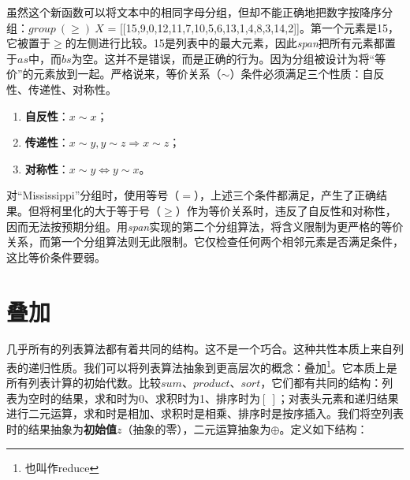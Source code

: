 \documentclass[b5paper]{ctexart}
\begin{document}
\be
{}
\ee

虽然这个新函数可以将文本中的相同字母分组，但却不能正确地把数字按降序分组：$\textit{group}\ (\geq)\ X$ = [[15,9,0,12,11,7,10,5,6,13,1,4,8,3,14,2]]。第一个元素是15，它被置于$\geq$的左侧进行比较。15是列表中的最大元素，因此\textit{span}把所有元素都置于$as$中，而$bs$为空。这并不是错误，而是正确的行为。因为分组被设计为将“等价”的元素放到一起。严格说来，等价关系（$\sim$）条件必须满足三个性质：自反性、传递性、对称性。

\begin{enumerate}
\item \textbf{自反性}：$x \sim x$；
\item \textbf{传递性}：$x \sim y, y \sim z \Rightarrow x \sim z$；
\item \textbf{对称性}：$x \sim y \Leftrightarrow y \sim x$。
\end{enumerate}

对``Mississippi''分组时，使用等号（$=$），上述三个条件都满足，产生了正确结果。但将柯里化的大于等于号（$\geq$）作为等价关系时，违反了自反性和对称性，因而无法按预期分组。用\textit{span}实现的第二个分组算法，将含义限制为更严格的等价关系，而第一个分组算法则无此限制。它仅检查任何两个相邻元素是否满足条件，这比等价条件要弱。

\begin{Exercise}
\end{Exercise}

\section{叠加}
\label{sec:fold}
  
几乎所有的列表算法都有着共同的结构。这不是一个巧合。这种共性本质上来自列表的递归性质。我们可以将列表算法抽象到更高层次的概念：叠加\footnote{也叫作reduce}。它本质上是所有列表计算的初始代数\cite{unplugged}。比较$sum$、$product$、$sort$，它们都有共同的结构：列表为空时的结果，求和时为0、求积时为1、排序时为$[\ ]$；对表头元素和递归结果进行二元运算，求和时是相加、求积时是相乘、排序时是按序插入。我们将空列表时的结果抽象为\textbf{初始值}$z$（抽象的零），二元运算抽象为$\oplus$。定义如下结构：
\end{document}
